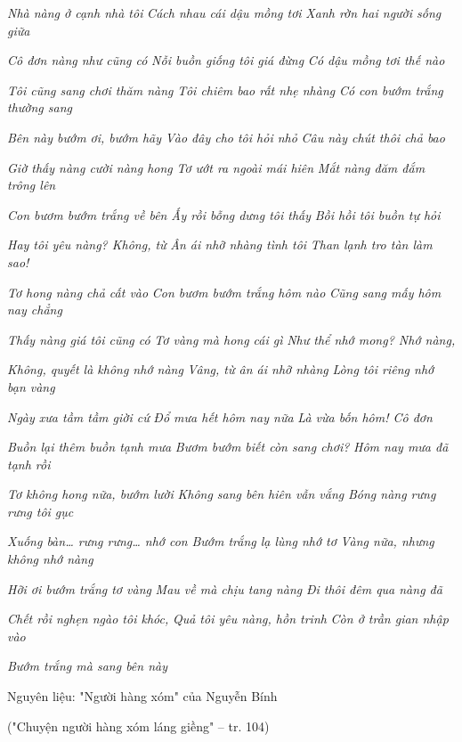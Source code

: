 \documentclass[../main.tex]{subfiles}
\begin{document}
\begin{multicols}{2}
\begin{blockquote}
\textit{Nhà nàng ở cạnh nhà tôi }
\textit{Cách nhau cái dậu mồng tơi }
\textit{Xanh rờn hai người sống giữa }

\textit{Cô đơn nàng như cũng có }
\textit{Nỗi buồn giống tôi giá đừng }
\textit{Có dậu mồng tơi thế nào }

\textit{Tôi cũng sang chơi thăm nàng }
\textit{Tôi chiêm bao rất nhẹ nhàng }
\textit{Có con bướm trắng thường sang} 

\textit{Bên này bướm ơi, bướm hãy }
\textit{Vào đây cho tôi hỏi nhỏ }
\textit{Câu này chút thôi chả bao }

\textit{Giờ thấy nàng cười nàng hong }
\textit{Tơ ướt ra ngoài mái hiên }
\textit{Mắt nàng đăm đắm trông lên }

\textit{Con bươm bướm trắng về bên }
\textit{Ấy rồi bỗng dưng tôi thấy }
\textit{Bồi hồi tôi buồn tự hỏi }

\textit{Hay tôi yêu nàng? Không, từ }
\textit{Ân ái nhỡ nhàng tình tôi }
\textit{Than lạnh tro tàn làm sao!} 

\textit{Tơ hong nàng chả cất vào} 
\textit{Con bươm bướm trắng hôm nào }
\textit{Cũng sang mấy hôm nay chẳng }

\textit{Thấy nàng giá tôi cũng có }
\textit{Tơ vàng mà hong cái gì }
\textit{Như thể nhớ mong? Nhớ nàng, }

\textit{Không, quyết là không nhớ nàng }
\textit{Vâng, từ ân ái nhỡ nhàng }
\textit{Lòng tôi riêng nhớ bạn vàng }

\textit{Ngày xưa tầm tầm giời cứ }
\textit{Đổ mưa hết hôm nay nữa }
\textit{Là vừa bốn hôm! Cô đơn }

\textit{Buồn lại thêm buồn tạnh mưa }
\textit{Bươm bướm biết còn sang chơi? }
\textit{Hôm nay mưa đã tạnh rồi }

\textit{Tơ không hong nữa, bướm lười }
\textit{Không sang bên hiên vẫn vắng} 
\textit{Bóng nàng rưng rưng tôi gục }

\textit{Xuống bàn… rưng rưng… nhớ con }
\textit{Bướm trắng lạ lùng nhớ tơ }
\textit{Vàng nữa, nhưng không nhớ nàng }

\textit{Hỡi ơi bướm trắng tơ vàng }
\textit{Mau về mà chịu tang nàng }
\textit{Đi thôi đêm qua nàng đã }

\textit{Chết rồi nghẹn ngào tôi khóc, }
\textit{Quả tôi yêu nàng, hồn trinh }
\textit{Còn ở trần gian nhập vào }

\textit{Bướm trắng mà sang bên này} 

Nguyên liệu: "Người hàng xóm" của Nguyễn Bính 

("Chuyện người hàng xóm láng giềng" – tr. 104) 


\end{blockquote}
\end{multicols}
\end{document}
